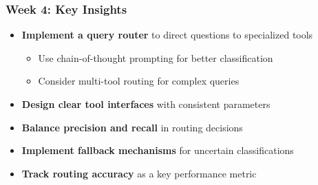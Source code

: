 \begin{frame}
    \frametitle{Week 4: Key Insights}
    
    \begin{center}
    \end{center}
    
    \begin{itemize}
        \item \textbf{Implement a query router} to direct questions to specialized tools
        \begin{itemize}
            \item Use chain-of-thought prompting for better classification
            \item Consider multi-tool routing for complex queries
        \end{itemize}
        \item \textbf{Design clear tool interfaces} with consistent parameters
        \item \textbf{Balance precision and recall} in routing decisions
        \item \textbf{Implement fallback mechanisms} for uncertain classifications
        \item \textbf{Track routing accuracy} as a key performance metric
    \end{itemize}
    
    \begin{center}
    \end{center}
\end{frame}

